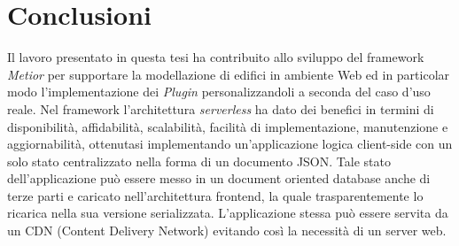 \section{Conclusioni}
\label{sec:conclusions_section_1}

Il lavoro presentato in questa tesi ha contribuito allo sviluppo del framework \emph{Metior}
per supportare la modellazione di edifici in ambiente Web ed in particolar modo l'implementazione dei \emph{Plugin}
personalizzandoli a seconda del caso d'uso reale.
Nel framework l'architettura \emph{serverless} ha dato dei benefici
in termini di disponibilità, affidabilità, scalabilità, facilità di implementazione, manutenzione e aggiornabilità,
ottenutasi implementando un'applicazione logica client-side con un solo stato centralizzato nella forma di un documento JSON.
Tale stato dell'applicazione può essere messo in un
document oriented database anche di terze parti e caricato nell'architettura frontend, la quale
trasparentemente lo ricarica nella sua versione serializzata.
L'applicazione stessa può essere servita da un CDN (Content Delivery Network) evitando così la necessità di un server web.
